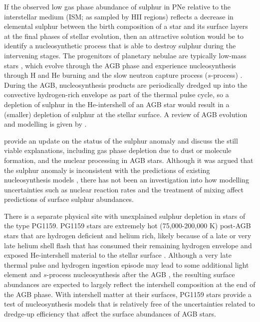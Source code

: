 If the observed low gas phase abundance of sulphur in PNe relative to the interstellar medium (ISM; as sampled by HII regions) reflects a decrease in elemental sulphur between the birth composition of a star and its surface layers at the final phases of stellar evolution, then an attractive solution would be to identify a nucleosynthetic process that is able to destroy sulphur during the intervening stages. The progenitors of planetary nebulae are typically low-mass stars \citep[e.g., 1.0 to 2.5 M$_\odot$;][]{Pottasch:2011ed}, which evolve through the AGB phase and experience nucleosynthesis through H and He burning and the slow neutron capture process ($s$-process) \citep[e.g.,][]{Gallino:1998eg,Busso:1999ig}. During the AGB, nucleosynthesis products are periodically dredged up into the convective hydrogen-rich envelope as part of the thermal pulse cycle, so a depletion of sulphur in the He-intershell of an AGB star would result in a (smaller) depletion of sulphur at the stellar surface. A review of AGB evolution and modelling is given by \citet{Herwig:2005jn}.

\citet{Henry:2012gd} provide an update on the status of the sulphur anomaly and discuss the still viable explanations, including gas phase depletion due to dust or molecule formation, and the nuclear processing in AGB stars. Although it was argued that the sulphur anomaly is inconsistent with the predictions of existing nucleosynthesis models \citep[e.g.,][]{Karakas:2010et}, there has not been an investigation into how modelling uncertainties such as nuclear reaction rates and the treatment of mixing affect predictions of surface sulphur abundances.

There is a separate physical site with unexplained sulphur depletion in stars of the type PG1159. PG1159 stars are extremely hot (75,000-200,000 K) post-AGB stars that are hydrogen deficient and helium rich, likely because of a late or very late helium shell flash that has consumed their remaining hydrogen envelope and exposed He-intershell material to the stellar surface \citep{vanWinckel:2003iw,Werner:1991tn}. Although a very late thermal pulse and hydrogen ingestion episode may lead to some additional light element and $s$-process nucleosynthesis after the AGB \citep{Herwig:2011dj,Stancliffe:2011dw}, the resulting surface abundances are expected to largely reflect the intershell composition at the end of the AGB phase. With intershell matter at their surfaces, PG1159 stars provide a test of nucleosynthesis models that is relatively free of the uncertainties related to dredge-up efficiency that affect the surface abundances of AGB stars.

